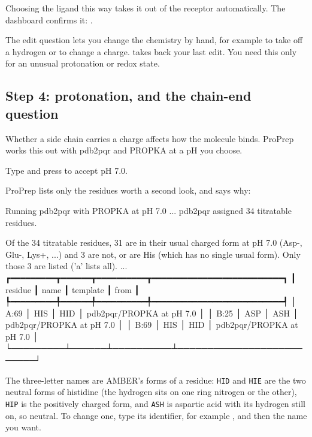 Choosing the ligand this way takes it out of the receptor automatically. The
dashboard confirms it: .

\begin{tip}
The edit question lets you change the chemistry by hand, for example
 to take off a hydrogen or  to change a
charge.  takes back your last edit. You need this only for an
unusual protonation or redox state.
\end{tip}

\subsection{Step 4: protonation, and the chain-end question}
\label{sec:docking-protonation}

Whether a side chain carries a charge affects how the molecule binds. ProPrep
works this out with pdb2pqr and PROPKA at a pH you choose.

\begin{steps}
  \item Type  and press  to accept pH 7.0.
  \item ProPrep lists only the residues worth a second look, and says why:
\begin{screen}
  Running pdb2pqr with PROPKA at pH 7.0 ...
  pdb2pqr assigned 34 titratable residues.

  Of the 34 titratable residues, 31 are in their usual charged form at
  pH 7.0 (Asp-, Glu-, Lys+, ...) and 3 are not, or are His (which has no
  single usual form). Only those 3 are listed ('a' lists all). ...
┏━━━━━━━━━┳━━━━━━┳━━━━━━━━━━┳━━━━━━━━━━━━━━━━━━━━━━━━━━┓
┃ residue ┃ name ┃ template ┃ from                     ┃
┡━━━━━━━━━╇━━━━━━╇━━━━━━━━━━╇━━━━━━━━━━━━━━━━━━━━━━━━━━┩
│ A:69    │ HIS  │ HID      │ pdb2pqr/PROPKA at pH 7.0 │
│ B:25    │ ASP  │ ASH      │ pdb2pqr/PROPKA at pH 7.0 │
│ B:69    │ HIS  │ HID      │ pdb2pqr/PROPKA at pH 7.0 │
└─────────┴──────┴──────────┴──────────────────────────┘
\end{screen}
\end{steps}

The three-letter names are AMBER's forms of a residue: \texttt{HID} and
\texttt{HIE} are the two neutral forms of histidine (the hydrogen sits on one
ring nitrogen or the other), \texttt{HIP} is the positively charged form, and
\texttt{ASH} is aspartic acid with its hydrogen still on, so neutral. To
change one, type its identifier, for example , and then the name
you want.

